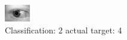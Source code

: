 \begin{figure}[h!]
\begin{center}
\includegraphics[width=0.60\columnwidth]{figures/ID852_class_2_target_4.png}
\end{center}
\caption{ Classification: 2 actual target: 4}
\label{fig:ID852_class_2_target_4}
\end{figure}
